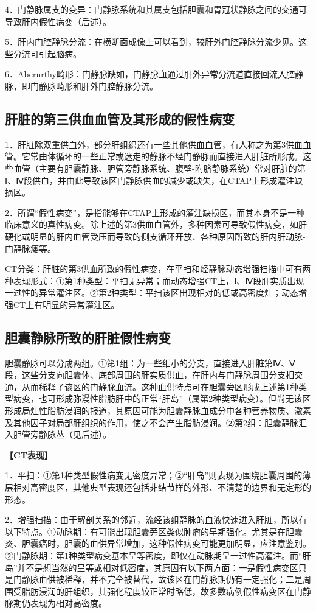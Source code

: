 4．门静脉属支的变异：门静脉系统和其属支包括胆囊和胃冠状静脉之间的交通可导致肝内假性病变（后述）。

5．肝内门腔静脉分流：在横断面成像上可以看到，较肝外门腔静脉分流少见。这些分流可引起脑病。

6．Abernrthy畸形：门静脉缺如，门静脉血通过肝外异常分流道直接回流入腔静脉，即门静脉畸形和肝外门腔静脉分流。

\subsection{肝脏的第三供血血管及其形成的假性病变}

1．肝脏除双重供血外，部分肝组织还有一些其他供血血管，有人称之为第3供血血管。它常由体循环的一些正常或迷走的静脉不经门静脉而直接进入肝脏所形成。这些血管（主要有胆囊静脉、胆管旁静脉系统、腹壁-附脐静脉系统）常对肝脏的第Ⅰ、Ⅳ段供血，并由此导致该区门静脉供血的减少或缺失，在CTAP上形成灌注缺损区。

2．所谓“假性病变”，是指能够在CTAP上形成的灌注缺损区，而其本身不是一种临床意义的真性病变。除上述的第3供血血管外，多种因素可导致假性病变，如肝硬化或明显的肝内血管受压而导致的侧支循环开放、各种原因所致的肝内肝动脉-门静脉瘘等。

CT分类：肝脏的第3供血所致的假性病变，在平扫和经静脉动态增强扫描中可有两种表现形式：①第1种类型：平扫无异常；而动态增强CT上，Ⅰ、Ⅳ段肝实质出现一过性的异常灌注区。②第2种类型：平扫该区出现相对的低或高密度灶；动态增强CT上有明显的异常灌注区。

\subsection{胆囊静脉所致的肝脏假性病变}

胆囊静脉可以分成两组。①第1组：为一些细小的分支，直接进入肝脏第Ⅳ、Ⅴ段，这些分支向胆囊体、底部周围的肝实质供血，在肝内与门静脉周围分支相交通，从而稀释了该区的门静脉血流。这种血供特点可在胆囊旁区形成上述第1种类型病变，也可形成弥漫性脂肪肝中的正常“肝岛”（属第2种类型病变）。但尚无该区形成局灶性脂肪浸润的报道，其原因可能为胆囊静脉血成分中各种营养物质、激素及其他因子对局部肝组织的作用，使之不会产生脂肪浸润。②第2组：胆囊静脉汇入胆管旁静脉丛（见后述）。

\textbf{【CT表现】}

1．平扫：①第1种类型假性病变无密度异常；②“肝岛”则表现为围绕胆囊周围的薄层相对高密度区，其他典型表现还包括非结节样的外形、不清楚的边界和无定形的形态。

2．增强扫描：由于解剖关系的邻近，流经该组静脉的血液快速进入肝脏，所以有以下特点。①动脉期：有可能出现胆囊旁区类似肿瘤的早期强化。尤其是在胆囊炎、胆囊癌时，胆囊的血供异常增加，这种假性病变可能更加明显，应注意鉴别。②门静脉期：第1种类型病变基本呈等密度，即仅在动脉期呈一过性高灌注。而“肝岛”并不是想当然的呈等或相对低密度，其原因有以下两方面：一是假性病变区只是门静脉血供被稀释，并不完全被替代，故该区在门静脉期仍有一定强化；二是周围受脂肪浸润的肝组织，其强化程度较正常时略低，故多数病例假性病变区在门静脉期仍表现为相对高密度。

